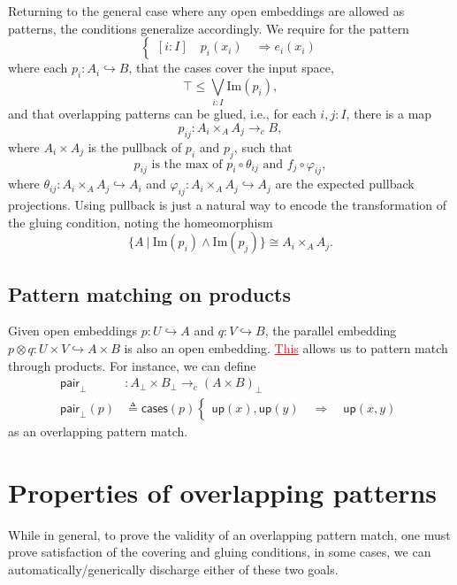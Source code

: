\documentclass[conference]{IEEEtran}
\newcommand{\hookto}{\hookrightarrow}
\newcommand{\cto}{\to_c}
\newcommand{\suchthat}{\ |\ }
\newcommand{\Img}[1]{\text{Im}\left({#1}\right)}
\newcommand{\Branch}{\Rightarrow}
\newcommand{\up}{\mathsf{up}}
\newcommand{\isthemaxof}[3]{{#1}\text{ is the max of }{#2}\text{ and }{#3}}
\newcommand{\grammar}[1]{\textcolor{red}{\underline{#1}}}
\begin{document}
Returning to the general case where any open embeddings are allowed as patterns, the conditions generalize accordingly. We require for the pattern
\[
\begin{cases}
[i : I] \quad p_i(x_i) \quad \Branch e_i(x_i)
\end{cases}
\]
where each $p_i : A_i \hookto B$, that the cases cover the input space,
\[
\top \le \bigvee_{i : I} \Img{p_i},
\]
and that overlapping patterns can be glued, i.e., for each $i, j : I$, there is a map
\[
p_{ij} : A_i \times_A A_j \cto B,
\]
where $A_i \times A_j$ is the pullback of $p_i$ and $p_j$, such that 
\[
\isthemaxof{ p_{ij} }{ p_i \circ \theta_{ij}}{ f_j \circ \varphi_{ij}},
\]
where $\theta_{ij} : A_i \times_A A_j \hookto A_i$ and $\varphi_{ij} : A_i \times_A A_j \hookto A_j$ are the expected pullback projections. Using pullback is just a natural way to encode the transformation of the gluing condition, noting the homeomorphism
\[
 \{A \suchthat \Img{p_i} \wedge \Img{p_j} \} \cong A_i \times_A A_j.
\]

\subsection{Pattern matching on products}

Given open embeddings $p : U \hookto A$ and $q : V \hookto B$, the parallel embedding $p \otimes q : U \times V \hookto A \times B$ is also an open embedding. \grammar{This} allows us to pattern match through products. 
For instance, we can define
\begin{align*}
 \mathsf{pair}_\bot &: A_\bot \times B_\bot \cto \left( A \times B \right)_\bot
\\ \mathsf{pair}_\bot(p) &\triangleq \mathsf{cases}(p)
\begin{cases}
\up(x) , \up(y)
  \quad \Branch \quad \up(x, y)
\end{cases}
\end{align*}
as an overlapping pattern match.

\section{Properties of overlapping patterns}
\label{s:properties}

While in general, to prove the validity of an overlapping pattern match, one must prove satisfaction of the covering and gluing conditions, in some cases, we can automatically/generically discharge either of these two goals. 
\end{document}
